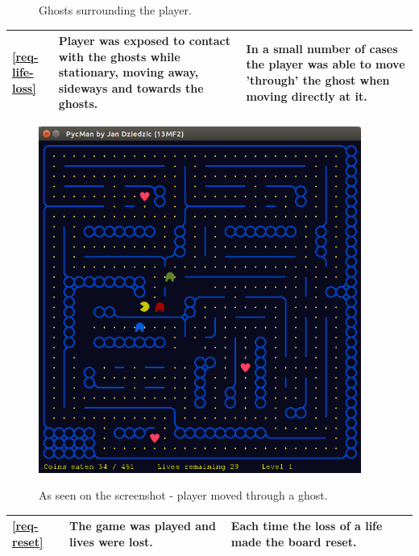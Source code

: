 \documentclass[11pt,a4paper,notitlepage]{report}
\newenvironment{img}{
	\begin{center}
		\begin{figure}[H]
			\begin{center}
			
}{
	\end{center}
		\end{figure}
			\end{center}
}
\begin{document}
\begin{center}
\begin{img}
					\caption{Ghosts surrounding the player.}
				\end{img}
				\begin{longtable}{ | p{2cm} | p{5cm} | p{4cm} |}
					\hline	
					\ref{req-life-loss}&Player was exposed to contact with the ghosts while stationary, moving away, sideways and towards the ghosts.&In a small number of cases the player was able to move 'through' the ghost when moving directly at it.\\ \hline
				\end{longtable}
				\begin{img}
					\includegraphics[width=300pt]{images/player-moved-through-ghost.png}\\
					\caption{As seen on the screenshot - player moved through a ghost.}
				\end{img}
				\begin{longtable}{ | p{2cm} | p{5cm} | p{4cm} |}
					\hline	
					\ref{req-reset}&The game was played and lives were lost.&Each time the loss of a life made the board reset.\\ \hline
				\end{longtable}
				\begin{img}

\end{img}
\end{center}
\end{document}
